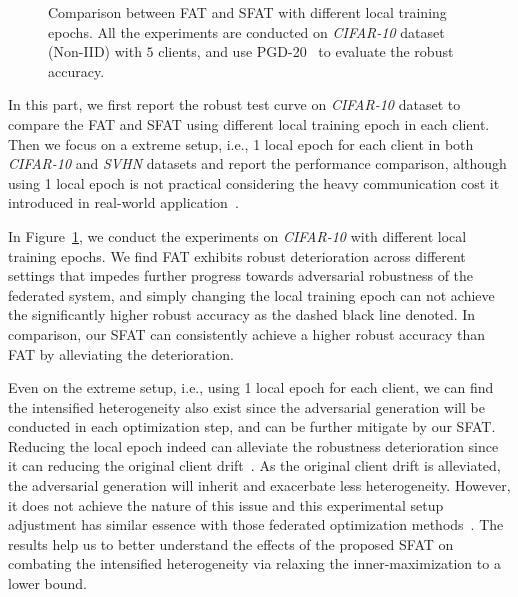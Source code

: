 \documentclass{article} %
\theoremstyle{plain}
\theoremstyle{definition}
\theoremstyle{remark}
\begin{document}
\begin{figure}[ht]
    \vspace{2mm}
    \centering
    \hspace{0.2in}
    \hspace{0.1in}
    \vspace{-2mm}
    \caption{Comparison between FAT and SFAT with different local training epochs. All the experiments are conducted on \textit{CIFAR-10} dataset (Non-IID) with $5$ clients, and use PGD-20~\citep{Madry_adversarial_training} to evaluate the robust accuracy.}
    \label{fig:local_epoch_app}
\end{figure}

In this part, we first report the robust test curve on \textit{CIFAR-10} dataset to compare the FAT and SFAT using different local training epoch in each client. Then we focus on a extreme setup, i.e., 1 local epoch for each client in both \textit{CIFAR-10} and \textit{SVHN} datasets and report the performance comparison, although using 1 local epoch is not practical considering the heavy communication cost it introduced in real-world application~\citep{mcmahan2017communication}.

In Figure~\ref{fig:local_epoch_app}, we conduct the experiments on \textit{CIFAR-10} with different local training epochs. We find FAT exhibits robust deterioration across different settings that impedes further progress towards adversarial robustness of the federated system, and simply changing the local training epoch can not achieve the significantly higher robust accuracy as the dashed black line denoted. In comparison, our SFAT can consistently achieve a higher robust accuracy than FAT by alleviating the deterioration.

Even on the extreme setup, i.e., using 1 local epoch for each client, we can find the intensified heterogeneity also exist since the adversarial generation will be conducted in each optimization step, and can be further mitigate by our SFAT. Reducing the local epoch indeed can alleviate the robustness deterioration since it can reducing the original client drift~\citep{mcmahan2017communication,li2018federated}. As the original client drift is alleviated, the adversarial generation will inherit and exacerbate less heterogeneity. However, it does not achieve the nature of this issue and this experimental setup adjustment has similar essence with those federated optimization methods~\citep{li2018federated,karimireddy2020scaffold}. The results help us to better understand the effects of the proposed SFAT on combating the intensified heterogeneity via relaxing the inner-maximization to a lower bound. 
\end{document}
